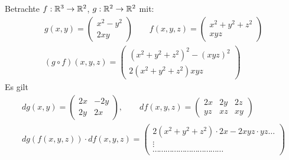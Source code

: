 \documentclass[a4paper]{article}
\begin{document}
		\begin{fmerke}
			Betrachte $f: \mathbb{R}^3 \rightarrow \mathbb{R}^2$, $g:\mathbb{R}^2 \rightarrow \mathbb{R}^2$ mit:
			\begin{align*}g(x,y) = \left( \begin{array}{c}
							x^2-y^2\\
							2xy
							\end{array} \right) \qquad 
			f(x,y,z) = \left( \begin{array}{c}
								x^2 + y^2 + z^2 \\
								xyz
								\end{array} \right) \\
			(g \circ f)(x,y,z)= 
								\left( \begin{array}{c}
										(x^2+y^2 +z^2)^2 - (xyz)^2 \\
										2(x^2+y^2+z^2)xyz
										\end{array} \right)
			\end{align*}
			Es gilt
			\begin{align*}
				dg(x,y) = \left( \begin{array}{cc}
								2x & -2y \\
								2y & 2x
								\end{array} \right), \qquad
				df(x,y,z) = \left( \begin{array}{ccc}
									2x& 2y & 2z\\
									yz &xz & xy
								\end{array} \right) \\
				dg(f(x,y,z)) \cdot df(x,y,z) = \left( \begin{array}{l} 
														2(x^2 +y^2+z^2) \cdot 2x - 2xyz\cdot yz \ldots \\
														\vdots \\
														\cdots\cdots\cdots\cdots\cdots\cdots\cdots\cdots\cdots\cdots\cdots
													\end{array} \right)
			\end{align*}
		\end{fmerke}
		
		
\end{document}
